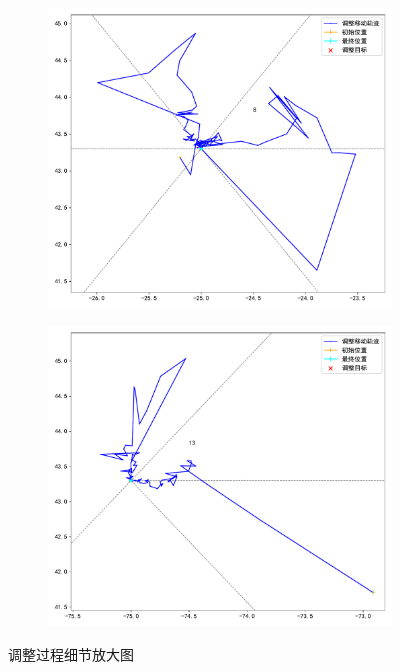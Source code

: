 \documentclass[withoutpreface,bwprint]{cumcmthesis} %
\begin{document}
\begin{figure}[H]
\begin{subfigure}{0.45\linewidth}
    \end{subfigure}
    \begin{subfigure}{0.45\linewidth}
        \includegraphics[width=1.0\linewidth]{figures/t_8.pdf}
    \end{subfigure}
    \begin{subfigure}{0.45\linewidth}
        \includegraphics[width=1.0\linewidth]{figures/t_13.pdf}
    \end{subfigure}
    \caption{调整过程细节放大图}
    \label{fig:my_label}
\end{figure}
\end{document}
